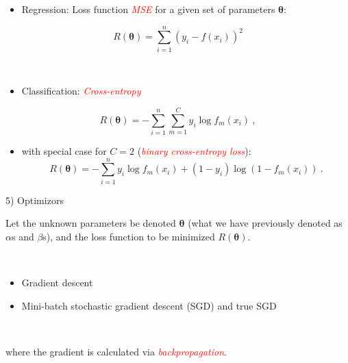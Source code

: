\documentclass[
  10pt,
  ignorenonframetext,
]{beamer}
\providecommand{\tightlist}{%
  \setlength{\itemsep}{0pt}\setlength{\parskip}{0pt}}
\begin{document}
\begin{frame}
\begin{itemize}
\tightlist
\item
  Regression: Loss function \emph{\textcolor{red}{MSE}} for a given set
  of parameters \(\boldsymbol{\theta}\):
\end{itemize}

\[R({\boldsymbol \theta}) = \sum_{i=1}^n (y_i- f(x_i))^2\]

\(~\)

\begin{itemize}
\tightlist
\item
  Classification: \emph{\textcolor{red}{Cross-entropy}}
\end{itemize}

\[R({\boldsymbol \theta}) = -\sum_{i=1}^n \sum_{m=1}^C y_i \log f_m(x_i) \ ,\]

\begin{itemize}
\tightlist
\item
  with special case for \(C=2\)
  (\emph{\textcolor{red}{binary cross-entropy loss}}):
  \[R({\boldsymbol \theta}) = -\sum_{i=1}^n  y_i \log f_m(x_i) + (1-y_i) \log (1-f_m(x_i)) \ .\]
\end{itemize}
\end{frame}

\begin{frame}
\begin{block}{5) Optimizors}
\protect\hypertarget{optimizors}{}
\(~\)

Let the unknown parameters be denoted \({\boldsymbol \theta}\) (what we
have previously denoted as \(\alpha\)s and \(\beta\)s), and the loss
function to be minimized \(R({\boldsymbol \theta})\).

\(~\)

\begin{itemize}
\item
  Gradient descent
\item
  Mini-batch stochastic gradient descent (SGD) and true SGD
\end{itemize}

\(~\)

where the gradient is calculated via
\emph{\textcolor{red}{backpropagation}}.
\end{block}
\end{frame}
\end{document}
